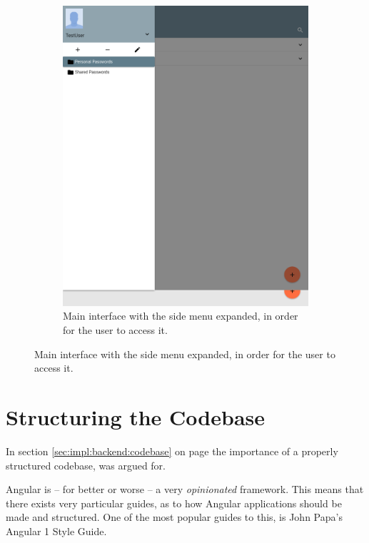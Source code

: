 \begin{figure}
			\begin{subfigure}[b]{0.75\textwidth}
				\includegraphics[width=\linewidth,clip,trim=0 800 200 0]{figures/implementation/screenshots/ghost_main_expanded_menu.png}
				\caption{Main interface with the side menu expanded, in order for the user to access it.}
				\label{fig:impl:responsive:expanded}
			\end{subfigure}

		\end{figure}




	\section{Structuring the Codebase}
		In section \ref{sec:impl:backend:codebase} on page \pageref{sec:impl:backend:codebase} the importance of a properly structured codebase, was argued for. 

		Angular is -- for better or worse -- a very \emph{opinionated} framework. This means that there exists very particular guides, as to how Angular applications should be made and structured. One of the most popular guides to this, is John Papa's Angular 1 Style Guide\cite{johnpapa_angular1}.

